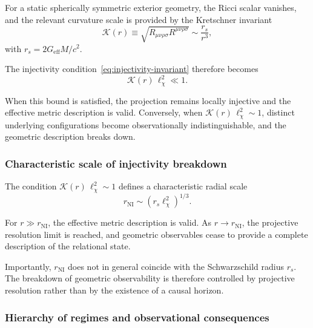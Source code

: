     For a static spherically symmetric exterior geometry, the Ricci scalar vanishes,
    and the relevant curvature scale is provided by the Kretschner invariant
    \begin{equation}
      \mathcal{K}(r)
      \equiv
      \sqrt{R_{\mu\nu\rho\sigma}R^{\mu\nu\rho\sigma}}
      \sim
      \frac{r_s}{r^3},
      \label{eq:kretschner-scale}
    \end{equation}
    with $r_s = 2G_{\mathrm{eff}}M/c^2$.

    The injectivity condition~\eqref{eq:injectivity-invariant} therefore becomes
    \begin{equation}
      \mathcal{K}(r)\,\ell_\chi^2 \ll 1.
      \label{eq:injectivity-kretsch}
    \end{equation}

    When this bound is satisfied, the projection remains locally injective and the
    effective metric description is valid.
    Conversely, when $\mathcal{K}(r)\,\ell_\chi^2 \sim 1$, distinct underlying
    configurations become observationally indistinguishable, and the geometric
    description breaks down.

  \subsubsection*{Characteristic scale of injectivity breakdown}

    The condition $\mathcal{K}(r)\,\ell_\chi^2 \sim 1$ defines a characteristic radial
    scale
    \begin{equation}
      r_{\mathrm{NI}}
      \sim
      \left(r_s \ell_\chi^2\right)^{1/3}.
      \label{eq:rNI}
    \end{equation}

    For $r \gg r_{\mathrm{NI}}$, the effective metric description is valid.
    As $r \to r_{\mathrm{NI}}$, the projective resolution limit is reached, and
    geometric observables cease to provide a complete description of the relational
    state.

    Importantly, $r_{\mathrm{NI}}$ does not in general coincide with the Schwarzschild
    radius $r_s$.
    The breakdown of geometric observability is therefore controlled by projective
    resolution rather than by the existence of a causal horizon.

  \subsubsection*{Hierarchy of regimes and observational consequences}

